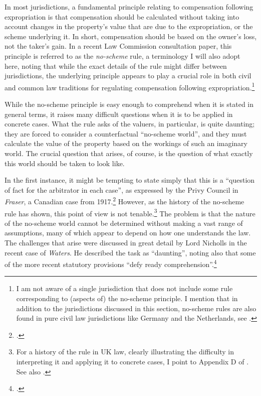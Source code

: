 In most jurisdictions, a fundamental principle relating to compensation following expropriation is that compensation should be calculated without taking into account changes in the property's value that are due to the expropriation, or the scheme underlying it. In short, compensation should be based on the owner's loss, not the taker's gain. In a recent Law Commission consultation paper, this principle is referred to as the \emph{no-scheme} rule, a terminology I will also adopt here, noting that while the exact details of the rule might differ between jurisdictions, the underlying principle appears to play a crucial role in both civil and common law traditions for regulating compensation following expropriation.\footnote{I am not aware of a single jurisdiction that does not include some rule corresponding to (aspects of) the no-scheme principle. I mention that in addition to the jurisdictions discussed in this section, no-scheme rules are also found in pure civil law jurisdictions like Germany and the Netherlands, see \cite[5,21]{sluysmans14}.}

While the no-scheme principle is easy enough to comprehend when it is stated in general terms, it raises many difficult questions when it is to be applied in concrete cases. What the rule asks of the valuers, in particular, is quite daunting; they are forced to consider a counterfactual ``no-scheme world'', and they must calculate the value of the property based on the workings of such an imaginary world. The crucial question that arises, of course, is the question of what exactly this world should be taken to look like.

In the first instance, it might be tempting to state simply that this is a ``question of fact for the arbitrator in each case'', as expressed by the Privy Council in \emph{Fraser}, a Canadian case from 1917.\footnote{\cite[194]{fraser17}.} However, as the history of the no-scheme rule has shown, this point of view is not tenable.\footnote{For a history of the rule in UK law, clearly illustrating the difficulty in interpreting it and applying it to concrete cases, I point to Appendix D of \cite{lawcom03}. See also \cite{lawcom01}.}  The problem is that the nature of the no-scheme world cannot be determined without making a vast range of assumptions, many of which appear to depend on how one understands the law. The challenges that arise were discussed in great detail by Lord Nicholls in the recent case of \emph{Waters}. He described the task as ``daunting'', noting also that some of the more recent statutory provisions ``defy ready comprehension''.\footnote{\cite[19]{waters04}.}

